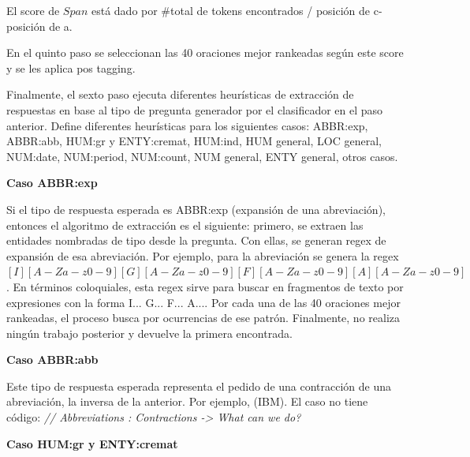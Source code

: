 El score de $Span$ está dado por \#total de tokens encontrados /  {\textbar}posición de c- posición de a{\textbar}.



\medskip

En el quinto paso se seleccionan las 40 oraciones mejor rankeadas según este score y se les aplica pos tagging.

Finalmente, el sexto paso ejecuta diferentes heurísticas de extracción de respuestas en base al tipo de pregunta generador por el clasificador en el paso anterior.
Define diferentes heurísticas para los siguientes casos: ABBR:exp, ABBR:abb, HUM:gr y ENTY:cremat, HUM:ind, HUM general, LOC general, NUM:date, NUM:period, NUM:count, NUM general, ENTY general, otros casos.\newline

\textbf{Caso ABBR:exp}\newline

Si el tipo de respuesta esperada es ABBR:exp (expansión de una abreviación), entonces el algoritmo de extracción es el siguiente: primero, se extraen las entidades nombradas de tipo  desde la pregunta. Con ellas, se generan regex de expansión de esa abreviación. Por ejemplo, para la abreviación  se genera la regex $[I][A-Za-z0-9][G][A-Za-z0-9][F][A-Za-z0-9][A][A-Za-z0-9]$. En términos coloquiales, esta regex sirve para buscar en fragmentos de texto por expresiones con la forma I... G... F... A.... Por cada una de las 40 oraciones mejor rankeadas, el proceso busca por ocurrencias de ese patrón. Finalmente, no realiza ningún trabajo posterior y devuelve la primera encontrada. \newline

\textbf{Caso ABBR:abb}\newline

Este tipo de respuesta esperada representa el pedido de una contracción de una abreviación, la inversa de la anterior. Por ejemplo,  (IBM). El caso no tiene código: \textit{// Abbreviations : Contractions -> What can we do?} \newline

\textbf{Caso HUM:gr y ENTY:cremat} \newline

